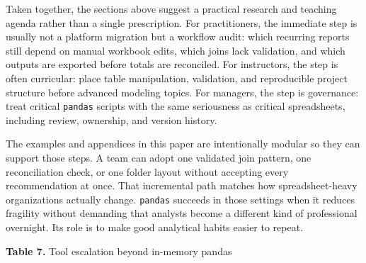 \documentclass[
  12pt,
]{article}
\begin{document}
Taken together, the sections above suggest a practical research and
teaching agenda rather than a single prescription. For practitioners,
the immediate step is usually not a platform migration but a workflow
audit: which recurring reports still depend on manual workbook edits,
which joins lack validation, and which outputs are exported before
totals are reconciled. For instructors, the step is often curricular:
place table manipulation, validation, and reproducible project structure
before advanced modeling topics. For managers, the step is governance:
treat critical \texttt{pandas} scripts with the same seriousness as
critical spreadsheets, including review, ownership, and version history.

The examples and appendices in this paper are intentionally modular so
they can support those steps. A team can adopt one validated join
pattern, one reconciliation check, or one folder layout without
accepting every recommendation at once. That incremental path matches
how spreadsheet-heavy organizations actually change. \texttt{pandas}
succeeds in those settings when it reduces fragility without demanding
that analysts become a different kind of professional overnight. Its
role is to make good analytical habits easier to repeat.

\textbf{Table 7.} Tool escalation beyond in-memory pandas
\end{document}

